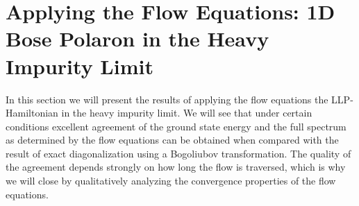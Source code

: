 \chapter{Applying the Flow Equations: 1D Bose Polaron in the Heavy Impurity Limit}\label{Results}
In this section we will present the results of applying the flow equations the LLP-Hamiltonian in the heavy impurity limit. We will see that under certain conditions excellent agreement of the ground state energy and the full spectrum as determined by the flow equations can be obtained when compared with the result of exact diagonalization using a Bogoliubov transformation. %
The quality of the agreement depends strongly on how long the flow is traversed, which is why we will close by qualitatively analyzing the convergence properties of the flow equations.
